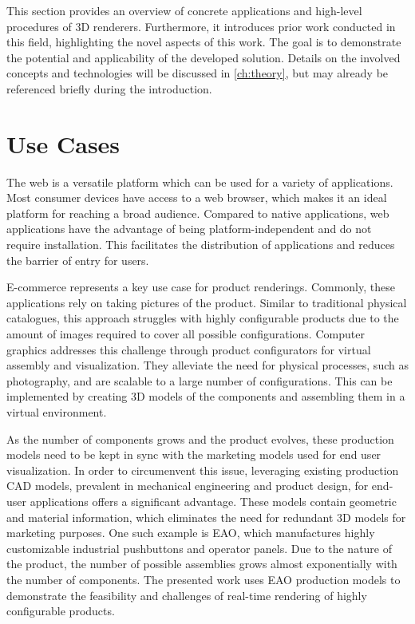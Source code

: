 
This section provides an overview of concrete applications and high-level procedures of 3D renderers. Furthermore, it introduces prior work conducted in this field, highlighting the novel aspects of this work. The goal is to demonstrate the potential and applicability of the developed solution. Details on the involved concepts and technologies will be discussed in \autoref{ch:theory}, but may already be referenced briefly during the introduction.

\section{Use Cases}

The web is a versatile platform which can be used for a variety of applications. Most consumer devices have access to a web browser, which makes it an ideal platform for reaching a broad audience. Compared to native applications, web applications have the advantage of being platform-independent and do not require installation. This facilitates the distribution of applications and reduces the barrier of entry for users.

E-commerce represents a key use case for product renderings. Commonly, these applications rely on taking pictures of the product. Similar to traditional physical catalogues, this approach struggles with highly configurable products due to the amount of images required to cover all possible configurations. Computer graphics addresses this challenge through product configurators for virtual assembly and visualization. They alleviate the need for physical processes, such as photography, and are scalable to a large number of configurations. This can be implemented by creating 3D models of the components and assembling them in a virtual environment.

As the number of components grows and the product evolves, these production models need to be kept in sync with the marketing models used for end user visualization. In order to circumenvent this issue, leveraging existing production \gls{CAD} models, prevalent in mechanical engineering and product design, for end-user applications offers a significant advantage. These models contain geometric and material information, which eliminates the need for redundant 3D models for marketing purposes. One such example is EAO, which manufactures highly customizable industrial pushbuttons and operator panels. Due to the nature of the product, the number of possible assemblies grows almost exponentially with the number of components. The presented work uses EAO production models to demonstrate the feasibility and challenges of real-time rendering of highly configurable products.

